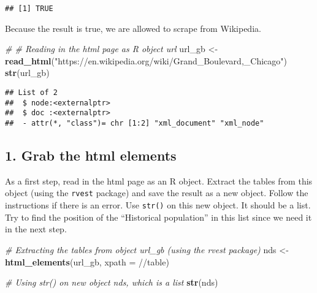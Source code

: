 \documentclass[
]{article}
\newenvironment{Shaded}{\begin{snugshade}}{\end{snugshade}}
\newcommand{\AttributeTok}[1]{\textcolor[rgb]{0.13,0.29,0.53}{#1}}
\newcommand{\CommentTok}[1]{\textcolor[rgb]{0.56,0.35,0.01}{\textit{#1}}}
\newcommand{\FunctionTok}[1]{\textcolor[rgb]{0.13,0.29,0.53}{\textbf{#1}}}
\newcommand{\NormalTok}[1]{#1}
\newcommand{\OtherTok}[1]{\textcolor[rgb]{0.56,0.35,0.01}{#1}}
\newcommand{\StringTok}[1]{\textcolor[rgb]{0.31,0.60,0.02}{#1}}
\begin{document}
\begin{verbatim}
## [1] TRUE
\end{verbatim}

Because the result is true, we are allowed to scrape from Wikipedia.

\begin{Shaded}
\begin{Highlighting}[]
\CommentTok{\# \# Reading in the html page as R object url}
\NormalTok{url\_gb }\OtherTok{\textless{}{-}} \FunctionTok{read\_html}\NormalTok{(}\StringTok{"https://en.wikipedia.org/wiki/Grand\_Boulevard,\_Chicago"}\NormalTok{)}
\FunctionTok{str}\NormalTok{(url\_gb)}
\end{Highlighting}
\end{Shaded}

\begin{verbatim}
## List of 2
##  $ node:<externalptr> 
##  $ doc :<externalptr> 
##  - attr(*, "class")= chr [1:2] "xml_document" "xml_node"
\end{verbatim}

\hypertarget{grab-the-html-elements}{%
\subsection{1. Grab the html elements}\label{grab-the-html-elements}}

As a first step, read in the html page as an R object. Extract the
tables from this object (using the \texttt{rvest} package) and save the
result as a new object. Follow the instructions if there is an error.
Use \texttt{str()} on this new object. It should be a list. Try to find
the position of the ``Historical population'' in this list since we need
it in the next step.

\begin{Shaded}
\begin{Highlighting}[]
\CommentTok{\# Extracting the tables from object url\_gb (using the \textasciigrave{}rvest\textasciigrave{} package) }
\NormalTok{nds }\OtherTok{\textless{}{-}} \FunctionTok{html\_elements}\NormalTok{(url\_gb, }\AttributeTok{xpath =} \StringTok{\textquotesingle{}//table\textquotesingle{}}\NormalTok{)}
\end{Highlighting}
\end{Shaded}

\begin{Shaded}
\begin{Highlighting}[]
\CommentTok{\# Using \textasciigrave{}str()\textasciigrave{} on new object nds, which is a list}
\FunctionTok{str}\NormalTok{(nds)}
\end{Highlighting}
\end{Shaded}
\end{document}
